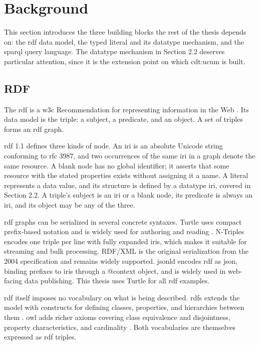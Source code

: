 \chapter{Background}

This section introduces the three building blocks the rest of the thesis depends on: the \ac{rdf} data model, the typed literal and its datatype mechanism, and the \ac{sparql} query language. The datatype mechanism in Section 2.2 deserves particular attention, since it is the extension point on which cdt:ucum is built.

\section{RDF}

The \ac{rdf} is a \ac{w3c} Recommendation for representing information in the Web \cite{cyganiak2014rdf}. Its data model is the triple: a subject, a predicate, and an object. A set of triples forms an \ac{rdf} graph.

\ac{rdf} 1.1 defines three kinds of node. An \ac{iri} is an absolute Unicode string conforming to \ac{rfc} 3987, and two occurrences of the same \ac{iri} in a graph denote the same resource. A blank node has no global identifier; it asserts that some resource with the stated properties exists without assigning it a name. A literal represents a data value, and its structure is defined by a datatype \ac{iri}, covered in Section 2.2. A triple's subject is an \ac{iri} or a blank node, its predicate is always an \ac{iri}, and its object may be any of the three.

\ac{rdf} graphs can be serialized in several concrete syntaxes. Turtle uses compact prefix-based notation and is widely used for authoring and reading \cite{beckett2014turtle}. N-Triples encodes one triple per line with fully expanded \acp{iri}, which makes it suitable for streaming and bulk processing. RDF/XML is the original serialization from the 2004 specification and remains widely supported. \ac{jsonld} encodes \ac{rdf} as \ac{json}, binding prefixes to \acp{iri} through a @context object, and is widely used in web-facing data publishing. This thesis uses Turtle for all \ac{rdf} examples.

\ac{rdf} itself imposes no vocabulary on what is being described. \ac{rdfs} extends the model with constructs for defining classes, properties, and hierarchies between them \cite{brickley2014rdfschema}. \ac{owl} adds richer axioms covering class equivalence and disjointness, property characteristics, and cardinality \cite{owl2012overview}. Both vocabularies are themselves expressed as \ac{rdf} triples. 

